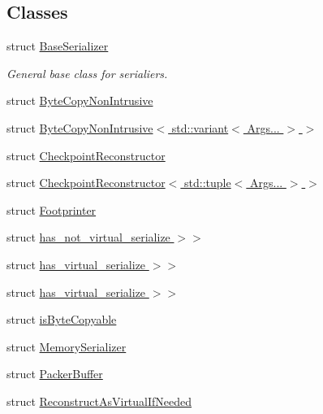 \subsection*{Classes}
\begin{DoxyCompactItemize}
\item 
struct \hyperlink{structcheckpoint_1_1_base_serializer}{Base\+Serializer}
\begin{DoxyCompactList}\small\item\em General base class for serialiers. \end{DoxyCompactList}\item 
struct \hyperlink{structcheckpoint_1_1_byte_copy_non_intrusive}{Byte\+Copy\+Non\+Intrusive}
\item 
struct \hyperlink{structcheckpoint_1_1_byte_copy_non_intrusive_3_01std_1_1variant_3_01_args_8_8_8_01_4_01_4}{Byte\+Copy\+Non\+Intrusive$<$ std\+::variant$<$ Args... $>$ $>$}
\item 
struct \hyperlink{structcheckpoint_1_1_checkpoint_reconstructor}{Checkpoint\+Reconstructor}
\item 
struct \hyperlink{structcheckpoint_1_1_checkpoint_reconstructor_3_01std_1_1tuple_3_01_args_8_8_8_01_4_01_4}{Checkpoint\+Reconstructor$<$ std\+::tuple$<$ Args... $>$ $>$}
\item 
struct \hyperlink{structcheckpoint_1_1_footprinter}{Footprinter}
\item 
struct \hyperlink{structcheckpoint_1_1_serialize_virtual_type_if_needed_3_01_t_00_01_serializer_t_00_01typename_01169395079d468e6ff618832a51e34843}{has\+\_\+not\+\_\+virtual\+\_\+serialize $>$$>$}
\item 
struct \hyperlink{structcheckpoint_1_1_reconstruct_as_virtual_if_needed_3_01_t_00_01_serializer_t_00_01typename_01ab92c606a95e76aaa723ec61628f6529}{has\+\_\+virtual\+\_\+serialize $>$$>$}
\item 
struct \hyperlink{structcheckpoint_1_1_serialize_virtual_type_if_needed_3_01_t_00_01_serializer_t_00_01typename_019c8f7fc8348eb3352805b18f8a3adb0b}{has\+\_\+virtual\+\_\+serialize $>$$>$}
\item 
struct \hyperlink{structcheckpoint_1_1is_byte_copyable}{is\+Byte\+Copyable}
\item 
struct \hyperlink{structcheckpoint_1_1_memory_serializer}{Memory\+Serializer}
\item 
struct \hyperlink{structcheckpoint_1_1_packer_buffer}{Packer\+Buffer}
\item 
struct \hyperlink{structcheckpoint_1_1_reconstruct_as_virtual_if_needed}{Reconstruct\+As\+Virtual\+If\+Needed}

\end{DoxyCompactItemize}
